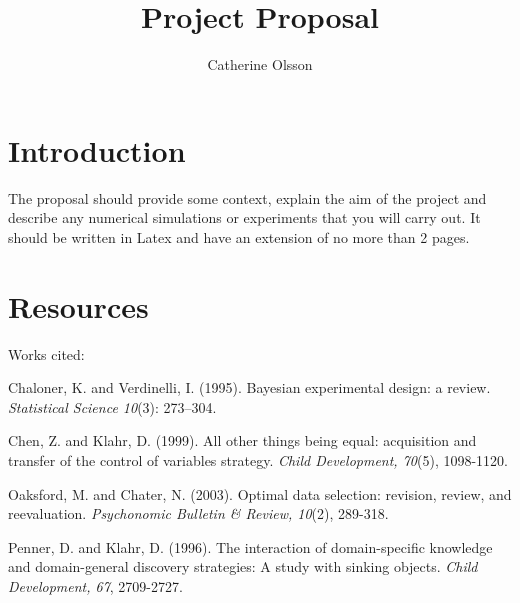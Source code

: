 \documentclass[12pt]{article}
\title{Project Proposal}
\author{Catherine Olsson}
\begin{document}
\maketitle

\section*{Introduction}
The proposal should provide some context, explain the aim of the project and describe any numerical simulations or experiments that you will carry out. It should be written in Latex and have an extension of no more than 2 pages.


\section*{Resources}
Works cited:
\\
\singlespace
\leftskip 0.5in
\parindent -0.5in

Chaloner, K. and Verdinelli, I. (1995). Bayesian experimental design:
a review. \emph{Statistical Science 10}(3): 273–304.

Chen, Z. and Klahr, D. (1999). All other things being equal: acquisition and transfer of the control of variables strategy. \emph{Child Development, 70}(5), 1098-1120.

Oaksford, M. and Chater, N. (2003). Optimal data selection: revision,
review, and reevaluation. \emph{Psychonomic Bulletin \& Review, 10}(2),
289-318.

Penner, D. and Klahr, D. (1996). The interaction of domain-specific knowledge and domain-general discovery strategies: A study with sinking objects. \emph{Child Development, 67}, 2709-2727.
\end{document}
